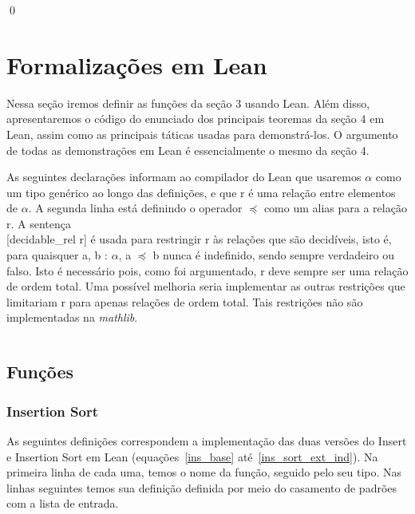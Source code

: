 \documentclass[12pt, oneside, a4paper,english,brazil]{abntex2}
\begin{document}
\qed


\chapter{Formaliza\c{c}\~oes em Lean}

Nessa se\c{c}\~ao iremos definir as fun\c{c}\~oes da se\c{c}\~ao 3 usando Lean. Al\'em disso, apresentaremos o c\'odigo do enunciado dos principais teoremas da se\c{c}\~ao 4 em Lean, assim como as principais t\'aticas usadas para demonstr\'a-los. O argumento de todas as demonstra\c{c}\~oes em Lean \'e essencialmente o mesmo da se\c{c}\~ao 4.

As seguintes declara\c{c}\~oes informam ao compilador do Lean que usaremos $\alpha$ como um tipo gen\'erico ao longo das defini\c{c}\~oes, e que \textsf{r} \'e uma rela\c{c}\~ao entre elementos de $\alpha$. A segunda linha est\'a definindo o operador \textsf{$\preceq$} como um alias para a rela\c{c}\~ao \textsf{r}. A senten\c{c}a\\ \textsf{[decidable\_rel r]} \'e usada para restringir \textsf{r} \`{a}s rela\c{c}\~oes que s\~ao decid\'iveis, isto \'e, para quaisquer \textsf{a, b : $\alpha$},
\textsf{a $\preceq$ b} nunca \'e indefinido, sendo sempre verdadeiro ou falso. Isto \'e
necess\'ario pois, como foi argumentado, \textsf{r} deve sempre ser uma rela\c{c}\~ao de
ordem total. Uma poss\'ivel melhoria seria implementar as outras restri\c{c}\~oes que limitariam \textsf{r} para apenas rela\c{c}\~oes de ordem total. Tais restri\c{c}\~oes n\~ao s\~ao implementadas na \textit{mathlib}.

\inputminted{lean}{declarations.lean}

\section{Fun\c{c}\~oes}

\subsection{Insertion Sort}

As seguintes defini\c{c}\~oes correspondem a implementa\c{c}\~ao das duas vers\~oes do
Insert e Insertion Sort em Lean (equa\c{c}\~oes~\ref{ins_base}
at\'e~\ref{ins_sort_ext_ind}). Na primeira linha de cada uma, temos o nome da
fun\c{c}\~ao, seguido pelo seu tipo. Nas linhas seguintes temos sua defini\c{c}\~ao
definida por meio do casamento de padr\~oes com a lista de entrada.

\inputminted{lean}{insertion_sort.lean}
\inputminted{lean}{insertion_sort_modified.lean}
\end{document}
